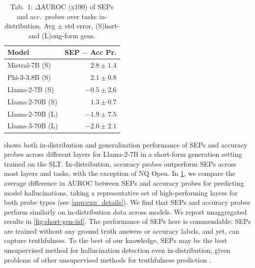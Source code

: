 \documentclass{article}
\begin{document}
\begin{table}
    \vspace{-13pt}
        \captionsetup{labelformat=empty}
        \setlength{\tabcolsep}{-2pt} %
            \caption{Tab.~1: $\Delta$AUROC (x100) of SEPs and acc.~probes over tasks in-distribution. Avg $\pm$ std error, (S)hort- and (L)ong-form gens.
                }
        \label{tab:in_distribution_short_and_long_gen}
        \vspace{-5pt}
    \begin{tabular}{lr}
    \toprule
    Model & SEP $-$ Acc Pr.\\
    \midrule
    Mistral-7B  {\tiny (S)}& $2.8 \pm 1.4$ \\
    Phi-3-3.8B  {\tiny (S)}& $2.1 \pm 0.8$ \\
    Llama-2-7B  {\tiny (S)}& $-0.5 \pm 2.6$ \\
    Llama-2-70B {\tiny (S)} & $1.3 \pm 0.7$ \\
    Llama-2-70B {\tiny (L)} & $-1.9\pm 7.5$ \\
    Llama-3-70B {\tiny (L)} & $-2.0\pm 2.1$ \\
    \bottomrule
\end{tabular}
        \setlength{\tabcolsep}{6pt}
        \vspace{-5pt}
\end{table}
 shows both in-distribution and generalization performance of SEPs and accuracy probes across different layers for Llama-2-7B in a short-form generation setting trained on the SLT.
In-distribution, accuracy probes outperform SEPs across most layers and tasks, with the exception of NQ Open.
In \cref{tab:in_distribution_short_and_long_gen}, we compare the average difference in AUROC between SEPs and accuracy probes for predicting model hallucinations, taking a representative set of high-performing layers for both probe types (see \cref{app:exp_details}).
We find that SEPs and accuracy probes perform similarly on in-distribution data across models.
We report unaggregated results in \cref{fig:short-gen-iid}.
The performance of SEPs here is commendable: SEPs are trained without any ground truth answers or accuracy labels, and yet, can capture truthfulness.
To the best of our knowledge, SEPs may be the best unsupervised method for hallucination detection even in-distribution, given problems of other unsupervised methods for truthfulness prediction \citep{farquhar2023challenges}.
\end{document}
